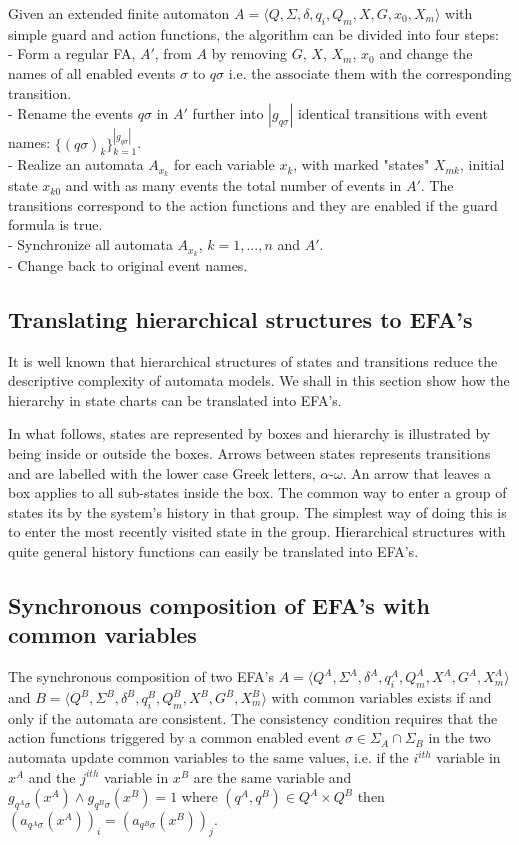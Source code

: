 \documentclass{article}
\begin{document}
Given an extended finite automaton $A=\langle Q, \Sigma, \delta,
q_i, Q_m, X, G ,x_0, X_m \rangle$ with simple guard and action
functions, the algorithm can be divided into four steps:\\
- Form a regular FA, $A'$, from $A$ by removing $G$, $X$, $X_m$,
$x_0$ and change the names of all enabled events $\sigma$ to
$q\sigma$ i.e. the associate them with the corresponding
transition.\\
- Rename the events $q\sigma$ in $A'$ further into $|g_{q \sigma}|$ identical transitions with event names: $\{(q\sigma)_k\}^{|g_{q \sigma}|}_{k=1}$.\\
- Realize an automata $A_{x_k}$ for each variable $x_k$, with
marked "states" $X_{mk}$, initial state $x_{k 0}$ and with as many events the total number of events in $A'$.
The transitions correspond to the action functions and they are enabled if the guard formula is true.\\
- Synchronize all automata $A_{x_k}$, $k=1,...,n$ and $A'$.\\
- Change back to original event names.
\newpage
\subsection{Translating hierarchical structures to EFA's}
It is well known that hierarchical structures of states and
transitions reduce the descriptive complexity of automata models.
We shall in this section show how the hierarchy in state charts
can be translated into EFA's.

In what follows, states are represented by boxes and hierarchy is
illustrated by being inside or outside the boxes. Arrows between
states represents transitions and are labelled with the lower case
Greek letters, $\alpha$-$\omega$. An arrow that leaves a box
applies to all sub-states inside the box. The common way to enter
a group of states its by the system's history in that group. The
simplest way of doing this is to enter the most recently visited
state in the group. Hierarchical structures with quite general
history functions can easily be translated into EFA's.




\subsection{Synchronous composition of EFA's with common variables}

The synchronous composition of two EFA's $A=\langle Q^A, \Sigma^A,
\delta^A, q^A_i, Q^A_m, X^{A}, G^A, X^A_m \rangle$ and $B=\langle
Q^B, \Sigma^B, \delta^B, q^B_i, Q^B_m, X^{B}, G^B, X^B_m \rangle$
with common variables exists if and only if the automata are
consistent. The consistency condition requires that the action
functions triggered by a common enabled event $\sigma\in
\Sigma_{A}\cap \Sigma_{B}$ in the two automata update common
variables to the same values, i.e. if the $i^{ith}$ variable in
$x^{A}$ and the $j^{ith}$ variable in $x^{B}$ are the same
variable and $g_{q^A \sigma}(x^{A})\wedge g_{q^B \sigma}(x^{B})=1$
where $(q^A,q^B)\in Q^A\times Q^B$ then $(a_{q^A \sigma}(x^{A}))_i
= (a_{q^B \sigma}(x^{B}))_j$.
\end{document}
